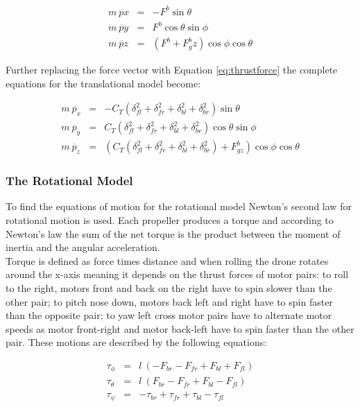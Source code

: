 \begin{eqnarray}{}
	m\ \ddot{px} &= & -F^b\sin\theta\\
	m\ \ddot{py} &= & F^b\cos\theta\sin\phi \\
	m\ \ddot{pz} &= & (F^b+F^b_gz)\cos\phi\cos\theta 
\end{eqnarray}

Further replacing the force vector with Equation \ref{eq:thrustforce} the complete equations for the translational model become:

\begin{eqnarray}{}
	m\ \ddot{p_x} &= & -C_T(\delta_{fl}^2 + \delta_{fr}^2 + \delta_{bl}^2 + \delta_{br}^2)\sin\theta\\
	m\ \ddot{p_y} &= & C_T(\delta_{fl}^2 + \delta_{fr}^2 + \delta_{bl}^2 + \delta_{br}^2)\cos\theta\sin\phi \\
	m\ \ddot{p_z} &= & (C_T(\delta_{fl}^2 + \delta_{fr}^2 + \delta_{bl}^2 + \delta_{br}^2)+F^b_{gz})\cos\phi\cos\theta 
\end{eqnarray}

\subsubsection{The Rotational Model}

To find the equations of motion for the rotational model Newton's second law for rotational motion is used. Each propeller produces a torque and according to Newton's law the sum of the net torque is the product between the moment of inertia and the angular acceleration.\\

Torque is defined as force times distance and when rolling the drone rotates around the x-axis meaning it depends on the thrust forces of motor pairs: to roll to the right, motors front and back on the right have to spin slower than the other pair; to pitch nose down, motors back left and right have to spin faster than the opposite pair; to yaw left cross motor pairs have to alternate motor speeds as motor front-right and motor back-left have to spin faster than the other pair. These motions are described by the following equations:

\begin{eqnarray}{}
    \tau_\phi &= & l \ (-F_{br} - F_{fr} + F_{bl} + F_{fl})\\
	\tau_\theta &= & l\ (F_{br} - F_{fr} + F_{bl} - F_{fl}) \\
	\tau_\psi &= & -\tau_{br} + \tau_{fr} + \tau_{bl} - \tau_{fl}
\end{eqnarray}

